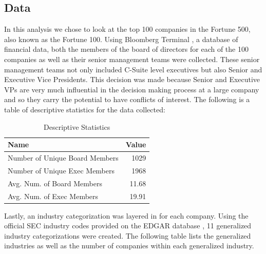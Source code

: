 \documentclass[a4paper]{article}
\begin{document}
    \subsection*{Data}

    In this analysis we chose to look at the top 100 companies in the Fortune 500, also known as the Fortune 100. Using Bloomberg Terminal \cite{bloomberg}, a database of financial data, both the members of the board of directors for each of the 100 companies as well as their senior management teams were collected. These senior management teams not only included C-Suite level executives but also Senior and Executive Vice Presidents. This decision was made because Senior and Executive VPs are very much influential in the decision making process at a large company and so they carry the potential to have conflicts of interest. The following is a table of descriptive statistics for the data collected:\\

    \begin{table}[h]
        \begin{tabular}{| l | r |}
            \hline
            \textbf{Name} & \textbf{Value} \\
            \hline
            Number of Unique Board Members & 1029 \\
            Number of Unique Exec Members & 1968 \\
            Avg. Num. of Board Members & 11.68 \\
            Avg. Num. of Exec Members & 19.91 \\
            \hline
        \end{tabular}
        \caption{Descriptive Statistics}
    \end{table}

    Lastly, an industry categorization was layered in for each company. Using the official SEC industry codes provided on the EDGAR database \cite{edgar}, 11 generalized industry categorizations were created. The following table lists the generalized industries as well as the number of companies within each generalized industry.\\
    
\end{document}
